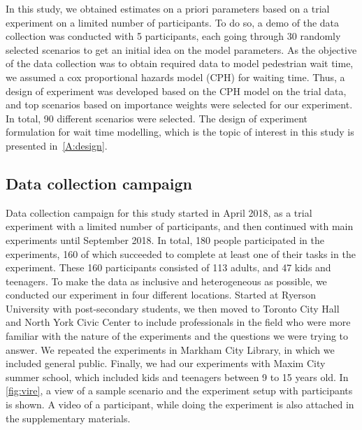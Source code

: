In this study, we obtained estimates on a priori parameters based on a trial experiment on a limited number of participants. To do so, a demo of the data collection was conducted with 5 participants, each going through 30 randomly selected scenarios to get an initial idea on the model parameters. As the objective of the data collection was to obtain required data to model pedestrian wait time, we assumed a cox proportional hazards model (CPH) for waiting time. Thus, a design of experiment was developed based on the CPH model on the trial data, and top scenarios based on importance weights were selected for our experiment. In total, 90 different scenarios were selected. The design of experiment formulation for wait time modelling, which is the topic of interest in this study is presented in~\cref{A:design}.

\subsection{Data collection campaign}
Data collection campaign for this study started in April 2018, as a trial experiment with a limited number of participants, and then continued with main experiments until September 2018. In total, 180 people participated in the experiments, 160 of which succeeded to complete at least one of their tasks in the experiment. These 160 participants consisted of 113 adults, and 47 kids and teenagers. To make the data as inclusive and heterogeneous as possible, we conducted our experiment in four different locations. Started at Ryerson University with post-secondary students, we then moved to Toronto City Hall and North York Civic Center to include professionals in the field who were more familiar with the nature of the experiments and the questions we were trying to answer. We repeated the experiments in Markham City Library, in which we included general public. Finally, we had our experiments with Maxim City summer school, which included kids and teenagers between 9 to 15 years old. In \cref{fig:vire}, a view of a sample scenario and the experiment setup with participants is shown. A video of a participant, while doing the experiment is also attached in the supplementary materials.


